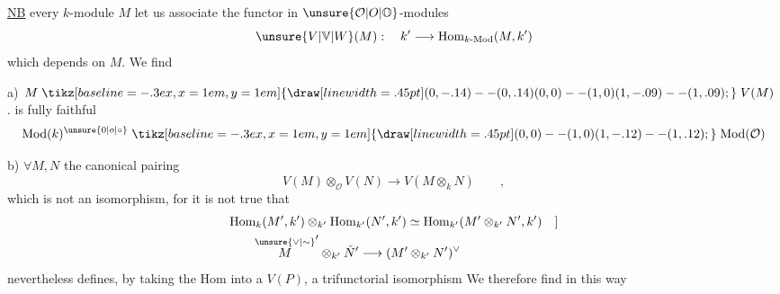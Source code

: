 
\uline{NB}  every $k$-module $M$ let us associate the functor in $\unsure{\mathcal O|O|\mathbb O}$-modules
\[
 \unsure{V|\mathbb V|W}(M):\quad k'\longrightarrow\mathrm{Hom}_{k\text{-}\mathrm{Mod}}(M,k')
\]
which depends  on $M$. We find

a) $M\mathrel{\tikz[baseline=-.3ex,x=1em,y=1em]{\draw[line width=.45pt] (0,-.14)--(0,.14) (0,0)--(1,0) (1,-.09)--(1,.09);}}V(M)$ . is fully faithful 
\[
 \mathrm{Mod}(k)^{\unsure{0|o|\circ}}\mathrel{\tikz[baseline=-.3ex,x=1em,y=1em]{\draw[line width=.45pt] (0,0)--(1,0) (1,-.12)--(1,.12);}}\mathrm{Mod}(\mathcal O)
\]

b) $\forall M,N$ \deleted{\unsure{$\xi$|:}} the canonical pairing
\[
 V(M)\otimes_{\mathcal O}V(N)\longrightarrow V(M\otimes_k N)\qquad,
\]
\unsure{(|[}which is not an isomorphism, for it is not true that
\[
\begin{aligned}
 &\mathrm{Hom}_{k}(M',k')\otimes_{k'}\mathrm{Hom}_{k'}(N',k')
 \simeq\mathrm{Hom}_{k'}(M'\otimes_{k'}N',k')\quad ]\\
 &\qquad \overset{\unsure{\vee|\sim}}{M}'\otimes_{k'}\check N'\longrightarrow(M'\otimes_{k'}N')^{\vee}
\end{aligned}
\]
nevertheless defines, by taking the $\mathrm{Hom}$ into  a $V(P)$, a trifunctorial isomorphism
We therefore find in this way

